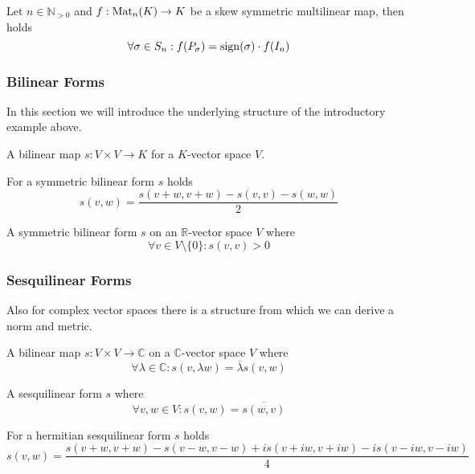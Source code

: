 \begin{lemma}\label{lem:identity_multilinear}
   Let \(n \in \mathbb{N}_{>0}\) and \(f: \operatorname{Mat}_n(K) \to K\) be a skew symmetric multilinear map, then holds
   \[\forall \sigma \in S_n: f(P_\sigma) = \operatorname{sign}(\sigma) \cdot f(I_n)\]
\end{lemma}

\subsubsection{Bilinear Forms}
In this section we will introduce the underlying structure of the introductory example above.

\begin{definition}
   A bilinear map \(s: V \times V \to K\) for a \(K\)-vector space \(V\).
\end{definition}
\begin{remark}
   For a symmetric bilinear form \(s\) holds
   \[s(v, w) = \frac{s(v + w, v + w) - s(v, v) - s(w, w)}{2}\]
\end{remark}

\begin{definition}
   A symmetric bilinear form \(s\) on an \(\mathbb{R}\)-vector space \(V\) where
   \[\forall v \in V \setminus \{0\}: s(v, v) > 0\]
\end{definition}

\subsubsection{Sesquilinear Forms}
Also for complex vector spaces there is a structure from which we can derive a norm and metric.
\begin{definition}
   A bilinear map \(s: V \times V \to \mathbb{C}\) on a \(\mathbb{C}\)-vector space \(V\) where
   \[\forall \lambda \in \mathbb{C}: s(v, \lambda w) = \overline{\lambda}s(v, w)\]
\end{definition}

\begin{definition}
   A sesquilinear form \(s\) where
   \[\forall v,w \in V: s(v, w) = \overline{s(w, v)}\]
\end{definition}
\begin{remark}
   For a hermitian sesquilinear form \(s\) holds
   \[s(v,w) = \frac{s(v+w, v+w) - s(v-w, v-w) + is(v+iw, v+iw) - is(v-iw, v-iw)}{4}\]
\end{remark}

